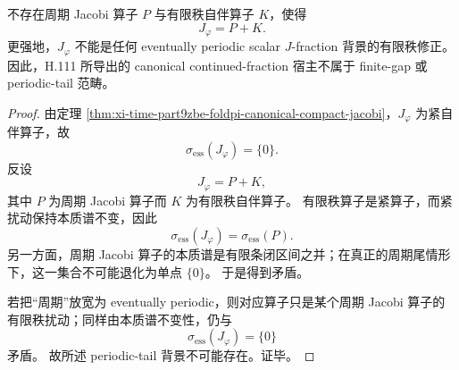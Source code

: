 \begin{theorem}\label{thm:xi-time-part9zbf-foldpi-no-finite-rank-periodic-tail-bridge}
不存在周期 Jacobi 算子 \(P\) 与有限秩自伴算子 \(K\)，使得
\[
J_\varphi=P+K.
\]
更强地，\(J_\varphi\) 不能是任何 eventually periodic scalar \(J\)-fraction 背景的有限秩修正。
因此，H.111 所导出的 canonical continued-fraction 宿主不属于 finite-gap 或 periodic-tail 范畴。
\end{theorem}
\begin{proof}
由定理 \ref{thm:xi-time-part9zbe-foldpi-canonical-compact-jacobi}，\(J_\varphi\) 为紧自伴算子，故
\[
\sigma_{\mathrm{ess}}(J_\varphi)=\{0\}.
\]
反设
\[
J_\varphi=P+K,
\]
其中 \(P\) 为周期 Jacobi 算子而 \(K\) 为有限秩自伴算子。
有限秩算子是紧算子，而紧扰动保持本质谱不变，因此
\[
\sigma_{\mathrm{ess}}(J_\varphi)=\sigma_{\mathrm{ess}}(P).
\]
另一方面，周期 Jacobi 算子的本质谱是有限条闭区间之并；在真正的周期尾情形下，这一集合不可能退化为单点 \(\{0\}\)。
于是得到矛盾。

若把“周期”放宽为 eventually periodic，则对应算子只是某个周期 Jacobi 算子的有限秩扰动；同样由本质谱不变性，仍与
\[
\sigma_{\mathrm{ess}}(J_\varphi)=\{0\}
\]
矛盾。
故所述 periodic-tail 背景不可能存在。证毕。
\end{proof}

